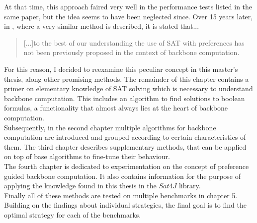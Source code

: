 At that time, this approach faired very well in the performance tests listed in the same paper, but the idea seems to have been neglected since. Over 15 years later, in \cite{PJ18}, where a very similar method is described, it is stated that...
\begin{quotation}
[...]to the best of our understanding the use of SAT with preferences has not been previously proposed in the context of backbone computation.
\end{quotation}

For this reason, I decided to reexamine this peculiar concept in this master's thesis, along other promising methods. The remainder of this chapter contains a primer on elementary knowledge of SAT solving which is necessary to understand backbone computation. This includes an algorithm to find solutions to boolean formulas, a functionality that almost always lies at the heart of backbone computation.\\
Subsequently, in the second chapter multiple algorithms for backbone computation are introduced and grouped according to certain characteristics of them. The third chapter describes supplementary methods, that can be applied on top of base algorithms to fine-tune their behaviour.\\
The fourth chapter is dedicated to experimentation on the concept of preference guided backbone computation. It also contains information for the purpose of applying the knowledge found in this thesis in the $Sat4J$ library. \\
Finally all of these methods are tested on multiple benchmarks in chapter 5. Building on the findings about individual strategies, the final goal is to find the optimal strategy for each of the benchmarks. 


\iffalse
Auch noch andere methoden 
normaler ansatz rechnet halt bisschen lösung aus, aber was wenn man die zu steuert ;
TODO introduction
wofür brauche ich backbones

wer hat sich damit beschäftigt

welche paper waren relevant

wie ist die thesis strukturiert, 

was wurde in den sechs monaten gemacht



hab prefbones erfunden

haben prefbones paper rausgesucht

was kann ich mit prefbones noch so anstellen

wie sehen die praktischen nutzen der prefbones varianten aus.



introduction soll aus perspektive vor dem schreiben geschrieben werden (absichten)

extra chap mit related work
nutzen für endnutzer und wirtschaft.
\fi